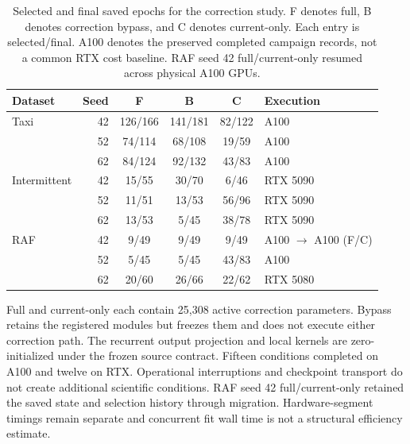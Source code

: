 \documentclass[runningheads]{llncs}
\begin{document}
\begin{table}[htbp]
\caption{Selected and final saved epochs for the correction study. F denotes full, B denotes correction bypass, and C denotes current-only. Each entry is selected/final. A100 denotes the preserved completed campaign records, not a common RTX cost baseline. RAF seed 42 full/current-only resumed across physical A100 GPUs.}
\label{tab:history-epochs}
\centering\small
\begin{tabular}{@{}lrcccl@{}}
\toprule
Dataset & Seed & F & B & C & Execution\\
\midrule
Taxi & 42 & 126/166 & 141/181 & 82/122 & A100\\
 & 52 & 74/114 & 68/108 & 19/59 & A100\\
 & 62 & 84/124 & 92/132 & 43/83 & A100\\
\midrule
Intermittent & 42 & 15/55 & 30/70 & 6/46 & RTX 5090\\
 & 52 & 11/51 & 13/53 & 56/96 & RTX 5090\\
 & 62 & 13/53 & 5/45 & 38/78 & RTX 5090\\
\midrule
RAF & 42 & 9/49 & 9/49 & 9/49 & A100 $\to$ A100 (F/C)\\
 & 52 & 5/45 & 5/45 & 43/83 & A100\\
 & 62 & 20/60 & 26/66 & 22/62 & RTX 5080\\
\bottomrule
\end{tabular}
\end{table}

Full and current-only each contain 25,308 active correction parameters. Bypass retains the registered modules but freezes them and does not execute either correction path. The recurrent output projection and local kernels are zero-initialized under the frozen source contract. Fifteen conditions completed on A100 and twelve on RTX. Operational interruptions and checkpoint transport do not create additional scientific conditions. RAF seed 42 full/current-only retained the saved state and selection history through migration. Hardware-segment timings remain separate and concurrent fit wall time is not a structural efficiency estimate.
\end{document}
